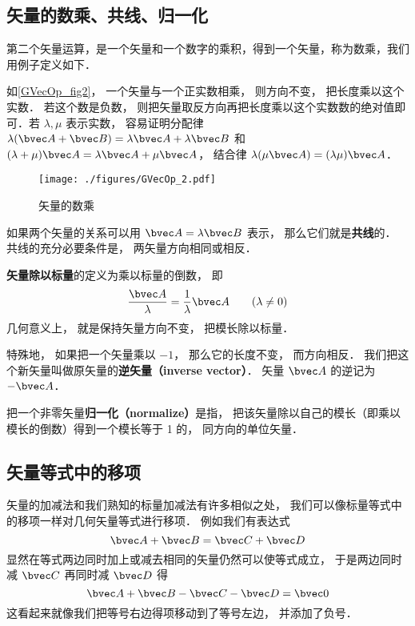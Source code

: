 \subsection{矢量的数乘、共线、归一化}
第二个矢量运算，是一个矢量和一个数字的乘积，得到一个矢量，称为数乘，我们用例子定义如下．

如\autoref{GVecOp_fig2}， 一个矢量与一个正实数相乘， 则方向不变， 把长度乘以这个实数． 若这个数是负数， 则把矢量取反方向再把长度乘以这个实数数的绝对值即可．若 $\lambda, \mu$ 表示实数， 容易证明分配律 $\lambda(\bvec A + \bvec B) = \lambda\bvec A + \lambda\bvec B$ 和 $(\lambda+\mu)\bvec A = \lambda\bvec A + \mu\bvec A$， 结合律 $\lambda(\mu\bvec A) = (\lambda\mu) \bvec A$．

\begin{figure}[ht]
\centering
\texttt{[image: ./figures/GVecOp\_2.pdf]}
\caption{矢量的数乘} \label{GVecOp_fig2}
\end{figure}

如果两个矢量的关系可以用 $\bvec A = \lambda\bvec B$ 表示， 那么它们就是\textbf{共线}的． 共线的充分必要条件是， 两矢量方向相同或相反．

\textbf{矢量除以标量}的定义为乘以标量的倒数， 即
\begin{equation}
\frac{\bvec A}{\lambda} = \frac{1}{\lambda} \bvec A \qquad (\lambda \ne 0)
\end{equation}
几何意义上， 就是保持矢量方向不变， 把模长除以标量．

特殊地， 如果把一个矢量乘以 $-1$， 那么它的长度不变， 而方向相反． 我们把这个新矢量叫做原矢量的\textbf{逆矢量（inverse vector）}． 矢量 $\bvec A$ 的逆记为 $-\bvec A$．

把一个非零矢量\textbf{归一化（normalize）}是指， 把该矢量除以自己的模长（即乘以模长的倒数）得到一个模长等于 1 的， 同方向的单位矢量．

\subsection{矢量等式中的移项}
矢量的加减法和我们熟知的标量加减法有许多相似之处， 我们可以像标量等式中的移项一样对几何矢量等式进行移项． 例如我们有表达式
\begin{equation}
\bvec A + \bvec B = \bvec C + \bvec D
\end{equation}
显然在等式两边同时加上或减去相同的矢量仍然可以使等式成立， 于是两边同时减 $\bvec C$ 再同时减 $\bvec D$ 得
\begin{equation}
\bvec A + \bvec B - \bvec C - \bvec D = \bvec 0
\end{equation}
这看起来就像我们把等号右边得项移动到了等号左边， 并添加了负号．

